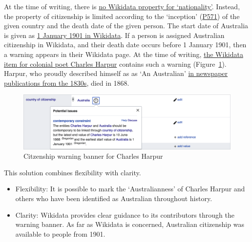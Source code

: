 \documentclass[
  a4paper,
  DIV=11,
  numbers=noendperiod]{scrreprt}
\providecommand{\tightlist}{%
  \setlength{\itemsep}{0pt}\setlength{\parskip}{0pt}}\usepackage{longtable,booktabs,array}
\begin{document}
At the time of writing, there is
\href{https://www.wikidata.org/w/index.php?title=Wikidata:Property_proposal/Nationality\&oldid=1232071609}{no
Wikidata property for `nationality'}. Instead, the property of
citizenship is limited according to the `inception'
(\href{https://www.wikidata.org/wiki/Property:P571}{P571}) of the given
country and the death date of the given person. The start date of
Australia is given as \href{https://www.wikidata.org/wiki/Q408\#P571}{1
January 1901 in Wikidata}. If a person is assigned Australian
citizenship in Wikidata, and their death date occurs before 1 January
1901, then a warning appears in their Wikidata page. At the time of
writing,
\href{https://www.wikidata.org/w/index.php?title=Q1064745\&oldid=1933534532}{the
Wikidata item for colonial poet Charles Harpur} contains such a warning
(Figure~\ref{fig-citizenship-warning}). Harpur, who proudly described
himself as as `An Australian'
\href{http://nla.gov.au/nla.news-article32148201}{in newspaper
publications from the 1830s}, died in 1868.

\begin{figure}

{\centering \includegraphics{assets/citizenship-warning.png}

}

\caption{\label{fig-citizenship-warning}Citzenship warning banner for
Charles Harpur}

\end{figure}

This solution combines flexibility with clarity.

\begin{itemize}
\tightlist
\item
  Flexibility: It is possible to mark the `Australianness' of Charles
  Harpur and others who have been identified as Australian throughout
  history.
\item
  Clarity: Wikidata provides clear guidance to its contributors through
  the warning banner. As far as Wikidata is concerned, Australian
  citizenship was available to people from 1901.
\end{itemize}
\end{document}
